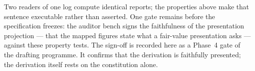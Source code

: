Two readers of one log compute identical reports; the properties above make
that sentence executable rather than asserted. One gate remains before the
specification freezes: the auditor bench signs the faithfulness of the
presentation projection --- that the mapped figures state what a fair-value
presentation asks --- against these property tests. The sign-off is recorded
here as a Phase~4 gate of the drafting programme. It confirms that the
derivation is faithfully presented; the derivation itself rests on the
constitution alone.
